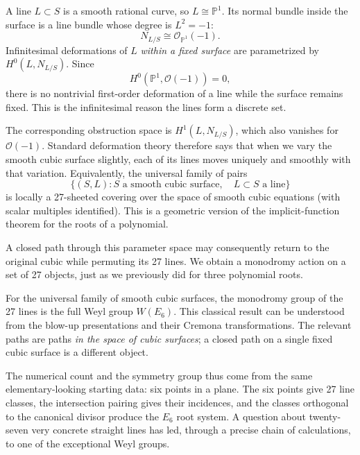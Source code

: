 A line \(L\subset S\) is a smooth rational curve, so \(L\cong\mathbb P^1\). Its normal bundle inside the surface is a line bundle whose degree is \(L^2=-1\):
\[
 N_{L/S}\cong\mathcal O_{\mathbb P^1}(-1).
\]
Infinitesimal deformations of \(L\) \emph{within a fixed surface} are parametrized by \(H^0(L,N_{L/S})\). Since
\[
 H^0(\mathbb P^1,\mathcal O(-1))=0,
\]
there is no nontrivial first-order deformation of a line while the surface remains fixed. This is the infinitesimal reason the lines form a discrete set.

The corresponding obstruction space is \(H^1(L,N_{L/S})\), which also vanishes for \(\mathcal O(-1)\). Standard deformation theory therefore says that when we vary the smooth cubic surface slightly, each of its lines moves uniquely and smoothly with that variation. Equivalently, the universal family of pairs
\[
 \{(S,L): S\text{ a smooth cubic surface},\quad L\subset S
       \text{ a line}\}
\]
is locally a 27-sheeted covering over the space of smooth cubic equations (with scalar multiples identified). This is a geometric version of the implicit-function theorem for the roots of a polynomial.

A closed path through this parameter space may consequently return to the original cubic while permuting its 27 lines. We obtain a monodromy action on a set of 27 objects, just as we previously did for three polynomial roots.

For the universal family of smooth cubic surfaces, the monodromy group of the 27 lines is the full Weyl group \(W(E_6)\). This classical result can be understood from the blow-up presentations and their Cremona transformations. The relevant paths are paths \emph{in the space of cubic surfaces}; a closed path on a single fixed cubic surface is a different object.

The numerical count and the symmetry group thus come from the same elementary-looking starting data: six points in a plane. The six points give 27 line classes, the intersection pairing gives their incidences, and the classes orthogonal to the canonical divisor produce the \(E_6\) root system. A question about twenty-seven very concrete straight lines has led, through a precise chain of calculations, to one of the exceptional Weyl groups.
